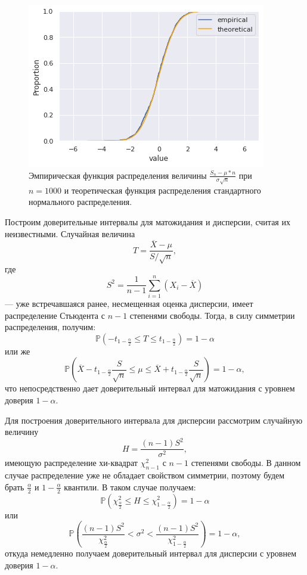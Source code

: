 \begin{figure}[ht]
	\centering
	\includegraphics[width = 0.7\linewidth]{"./resources/central_limit_theorem.png"}
	\caption{Эмпирическая функция распределения величины $ \frac{S_n - \mu * n}{\sigma
	 \sqrt{n}} $ при $ n = 1000 $ и теоретическая функция распределения стандартного
	 нормального распределения.}
    \label{fig:central_limit_theorem}
\end{figure}

Построим доверительные интервалы для матожидания и дисперсии, считая их неизвестными.
 Случайная величина
$$
 T = \dfrac{\overline{X} - \mu}{S / \sqrt{n}},
$$
где 
$$
 S^2 = \dfrac{1}{n - 1} \displaystyle\sum_{i = 1}^n(X_i - \overline{X})
$$
--- уже встречавшаяся ранее, несмещенная оценка дисперсии, имеет распределение
 Стьюдента с $ n - 1 $ степенями свободы. Тогда, в силу симметрии распределения,
 получим:
$$
 \mathbb{P} \left( -t_{1 - \frac{\alpha}{2}} \leq T \leq t_{1 -
 \frac{\alpha}{2}} \right) = 1 - \alpha
$$
или же
$$
 \mathbb{P} \left( \overline{X} - t_{1 - \frac{\alpha}{2}} \frac{S}{\sqrt{n}}
 \leq \mu \leq \overline{X} + t_{1 - \frac{\alpha}{2}} \frac{S}{\sqrt{n}} \right)
 = 1 - \alpha,
$$
что непосредственно дает доверительный интервал для матожидания с уровнем доверия
 $ 1 - \alpha $.

Для построения доверительного интервала для дисперсии рассмотрим случайную величину
$$
 H = \dfrac{(n-1)S^2}{\sigma^2},
$$
имеющую распределение хи-квадрат $ \chi_{n-1}^2 $ с $ n - 1 $ степенями свободы.
В данном случае распределение уже не обладает свойством симметрии, поэтому будем
 брать $ \frac{\alpha}{2} $ и $ 1 - \frac{\alpha}{2} $ квантили. В таком случае
 получаем:
$$
\mathbb{P} \left( \chi_{\frac{\alpha}{2}}^2 \leq H \leq \chi_{1 -
 \frac{\alpha}{2}}^2 \right) = 1 - \alpha
$$
или
$$
\mathbb{P} \left( \dfrac{(n - 1) S^2}{\chi_{\frac{\alpha}{2}}^2} < \sigma^2 <
 \dfrac{(n - 1) S^2}{\chi_{1 - \frac{\alpha}{2}}^2} \right) = 1 - \alpha,
$$
откуда немедленно получаем доверительный интервал для дисперсии с уровнем
 доверия $ 1 - \alpha $.
 
